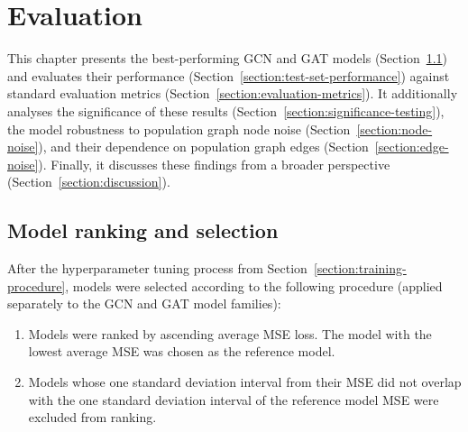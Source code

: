\chapter{Evaluation}
\label{chapter:evaluation}


This chapter presents the best-performing GCN and GAT models (Section~\ref{section:model-ranking}) and evaluates their performance (Section~\ref{section:test-set-performance}) against standard evaluation metrics (Section~\ref{section:evaluation-metrics}). It additionally analyses the significance of these results (Section~\ref{section:significance-testing}), the model robustness to population graph node noise (Section~\ref{section:node-noise}), and their dependence on population graph edges (Section~\ref{section:edge-noise}). Finally, it discusses these findings from a broader perspective (Section~\ref{section:discussion}).

\section{Model ranking and selection}
\label{section:model-ranking}
After the hyperparameter tuning process from Section~\ref{section:training-procedure}, models were selected according to the following procedure (applied separately to the GCN and GAT model families):
\begin{enumerate}
    \item Models were ranked by ascending average MSE loss. The model with the lowest average MSE was chosen as the reference model.
    \item Models whose one standard deviation interval from their MSE did not overlap with the one standard deviation interval of the reference model MSE were excluded from ranking.
\end{enumerate}

